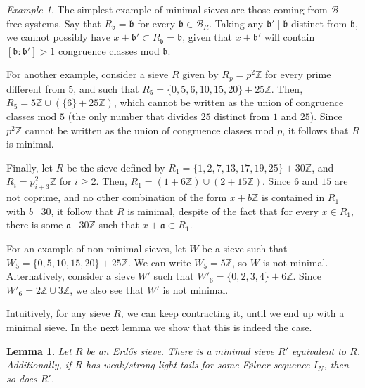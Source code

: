 \documentclass[a4paper,11pt,reqno]{amsart}
\theoremstyle{plain}
\newtheorem{lemma}[theorem]{Lemma}
\theoremstyle{remark}
\newtheorem{example}[theorem]{Example}
\newcommand{\z}{\mathbb{Z}}
\newcommand{\cb}{\mathcal{B}}
\newcommand{\cbr}{\mathcal{B}_R}
\newcommand{\ga}{\mathfrak{a}}
\newcommand{\gb}{\mathfrak{b}}
\begin{document}
		\begin{example}
			\label{ex: B-free systems are minimal}
			The simplest example of minimal sieves are those coming from $\cb-$free systems. Say that $R_\gb = \gb$ for every $\gb \in \cbr$. Taking any $\gb' \mid \gb$ distinct from $\gb$, we cannot possibly have $x+\gb' \subset R_\gb = \gb$, given that $x+\gb'$ will contain $[\gb:\gb'] >1$ congruence classes mod $\gb$. 
			
			For another example, consider a sieve $R$ given by $R_p = p^2\z$ for every prime different from $5$, and such that $R_5 = \{0,5,6,10, 15,20\} + 25 \z$. Then, $R_5 = 5\z \cup (\{6\}+25\z)$, which cannot be written as the union of congruence classes mod $5$ (the only number that divides $25$ distinct from $1$ and $25$). Since $p^2\z$ cannot be written as the union of congruence classes mod $p$, it follows that $R$ is minimal. 
			
			Finally, let $R$ be the sieve defined by $R_1 = \{1,2,7,13,17,19,25\} + 30 \z$, and $R_i = p_{i+3}^2\z$ for $i \geq 2$. Then, $R_1 = (1+6\z) \cup (2+15\z). $ Since $6$ and $15$ are not coprime, and no other combination of the form $x+b\z$ is contained in $R_1$ with $b\mid 30$, it follow that $R$ is minimal, despite of the fact that for every $x \in R_1$, there is some $\ga \mid 30\z$ such that $x+\ga \subset R_1$.
			
			For an example of non-minimal sieves, let $W$ be a sieve such that $W_5 = \{0,5,10, 15,20\} + 25 \z$. We can write $W_5 = 5 \z$, so $W$ is not minimal. Alternatively, consider a sieve $W'$ such that $W'_6 =\{0,2,3,4\} + 6 \z$.  Since $W'_6 = 2\z \cup 3\z$, we also see that $W'$ is not minimal.
		\end{example}
		
		
		
		Intuitively, for any sieve $R$, we can keep contracting it, until we end up with a minimal sieve. In the next lemma we show that this is indeed the case. 
		
		
		
		\begin{lemma}
			\label{lm: every sieve is equivalent to minimal sieve}
			Let $R$ be an Erdős sieve. There is a minimal sieve $R'$ equivalent to $R$. Additionally, if $R$ has weak/strong light tails for some Følner sequence $I_N$, then so does $R'$.
		\end{lemma}
		
\end{document}
